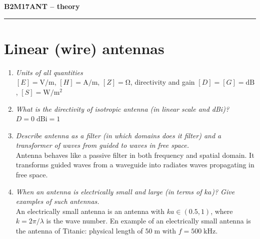 \documentclass[11pt,a4paper]{article}
\renewcommand{\ohm}{{\mathrm{\Omega}}}
\begin{document}

\noindent\LARGE\textbf{B2M17ANT -- theory}\normalsize\\
\noindent\rule{12.5cm}{0.4pt}
\tableofcontents

\newpage\section{Linear (wire) antennas}
\begin{enumerate}
    \item \emph{Units of all quantities}\\
    $[E] = \mathrm V/\mathrm m$, $[H] = \mathrm A/\mathrm m$, $[Z] = \ohm$, directivity and gain $[D] = [G] = \mathrm{dB}$, $[S] = \mathrm W/\mathrm m^2$

    \item \emph{What is the directivity of isotropic antenna (in linear scale and \emph{dBi})?}\\
    $D = 0 \;\mathrm{dBi} = 1$

    \item \emph{Describe antenna as a filter (in which domains does it filter) and a transformer of waves from guided to waves in free space.}\\
    Antenna behaves like a passive filter in both frequency and spatial domain. It transforms guided waves from a waveguide into radiates waves propagating in free space.

    \item \emph{When an antenna is electrically small and large (in terms of $ka$)? Give examples of such antennas.}\\
    An electrically small antenna is an antenna with $ka \in (0.5, 1)$, where $k = 2\pi/\lambda$ is the wave number. En example of an electrically small antenna is the antenna of Titanic: physical length of $50 \; \mathrm m$ with $f = 500 \; \mathrm{kHz}$.


\end{enumerate}
\end{document}
